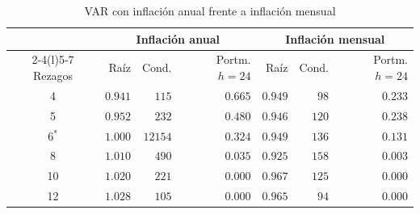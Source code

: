 \begin{table}[H]
\centering
\caption{VAR con inflación anual frente a inflación mensual}
\label{tab:inflacion_anual_mensual}
\small
\begin{tabular}{@{}crrrrrr@{}}
\toprule
 & \multicolumn{3}{c}{Inflación anual} & \multicolumn{3}{c}{Inflación mensual} \\
\cmidrule(lr){2-4}\cmidrule(l){5-7}
Rezagos & Raíz & Cond. & Portm. $h=24$ & Raíz & Cond. & Portm. $h=24$ \\
\midrule
4 & $0.941$ & $115$ & $0.665$ & $0.949$ & $98$ & $0.233$ \\
5 & $0.952$ & $232$ & $0.480$ & $0.946$ & $120$ & $0.238$ \\
6$^{*}$ & $1.000$ & $12154$ & $0.324$ & $0.949$ & $136$ & $0.131$ \\
8 & $1.010$ & $490$ & $0.035$ & $0.925$ & $158$ & $0.003$ \\
10 & $1.020$ & $221$ & $0.000$ & $0.967$ & $125$ & $0.000$ \\
12 & $1.028$ & $105$ & $0.000$ & $0.965$ & $94$ & $0.000$ \\
\bottomrule
\end{tabular}
\end{table}
